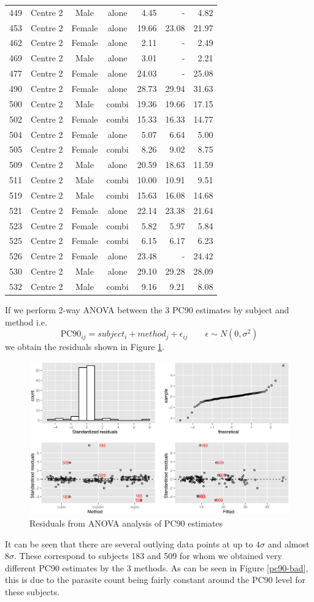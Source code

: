 \begin{table}
\begin{tabular}{|cccc|rrr|}
449&Centre 2&Male&alone&4.45&-&4.82\\
453&Centre 2&Female&alone&19.66&23.08&21.97\\
462&Centre 2&Female&alone&2.11&-&2.49\\
469&Centre 2&Male&alone&3.01&-&2.21\\
477&Centre 2&Female&alone&24.03&-&25.08\\
490&Centre 2&Female&alone&28.73&29.94&31.63\\
500&Centre 2&Male&combi&19.36&19.66&17.15\\
502&Centre 2&Female&combi&15.33&16.33&14.77\\
504&Centre 2&Female&alone&5.07&6.64&5.00\\
505&Centre 2&Female&combi&8.26&9.02&8.75\\
509&Centre 2&Male&alone&20.59&18.63&11.59\\
511&Centre 2&Male&combi&10.00&10.91&9.51\\
519&Centre 2&Male&combi&15.63&16.08&14.68\\
521&Centre 2&Female&alone&22.14&23.38&21.64\\
523&Centre 2&Female&combi&5.82&5.97&5.84\\
525&Centre 2&Female&combi&6.15&6.17&6.23\\
526&Centre 2&Female&alone&23.48&-&24.42\\
530&Centre 2&Male&alone&29.10&29.28&28.09\\
532&Centre 2&Male&combi&9.16&9.21&8.08\\
\hline
\end{tabular}
\end{table}
If we perform 2-way ANOVA between the 3 PC90 estimates by subject and method i.e.
$$\mathrm{PC}90_{ij}=subject_{i}+method_{j}+\epsilon_{ij}\quad\quad\epsilon\sim N(0,\sigma^{2})$$ 
we obtain the residuals shown in Figure \ref{pc90resid}.
\begin{figure}[h]
\includegraphics[width=6.5in]{pc90resid.eps} 
\caption{Residuals from ANOVA analysis of PC90 estimates}
\label{pc90resid}
\end{figure}
 It can be seen that there are several outlying data points at up to $4\sigma$ and almost $8\sigma$. These correspond to subjects 183 and 509 for whom we obtained very different PC90 estimates by the 3 methods. As can be seen in Figure \ref{pc90-bad}, this is due to the parasite count being fairly constant around the PC90 level for these subjects.

